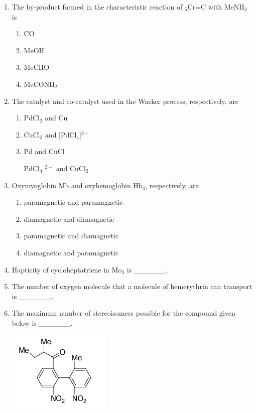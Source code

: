 \documentclass[journal,12pt,onecolumn]{IEEEtran}
\theoremstyle{remark}
\begin{document}
\begin{enumerate}
\item The by-product formed in the characteristic reaction of $_5$Cr=C with MeNH$_2$ is
\begin{enumerate}
    \item CO
    \item MeOH
    \item MeCHO
    \item MeCONH$_2$
\end{enumerate}
\hfill \textbf{}

\item The catalyst and co-catalyst used in the Wacker process, respectively, are
\begin{enumerate}
    \item PdCl$_2$ and Cu
    \item CuCl$_2$ and [PdCl$_4$]$^{2-}$
    \item Pd and CuCl
    \item [PdCl$_4$]$^{2-}$ and CuCl$_2$
\end{enumerate}
\hfill \textbf{}

\item Oxymyoglobin Mb and oxyhemoglobin Hb$_4$, respectively, are
\begin{enumerate}
    \item paramagnetic and paramagnetic
    \item diamagnetic and diamagnetic
    \item paramagnetic and diamagnetic
    \item diamagnetic and paramagnetic
\end{enumerate}
\hfill \textbf{}

\item Hapticity of cycloheptatriene in Mo$_3$ is \_\_\_\_\_\_.
\hfill \textbf{}

\item The number of oxygen molecule that a molecule of hemerythrin can transport is \_\_\_\_\_\_.
\hfill \textbf{}

\item The maximum number of stereoisomers possible for the compound given below is \_\_\_\_\_\_.
\begin{center}
    \includegraphics[width=0.3\columnwidth]{q17}
\end{center}
\hfill \textbf{}


\end{enumerate}
\end{document}

